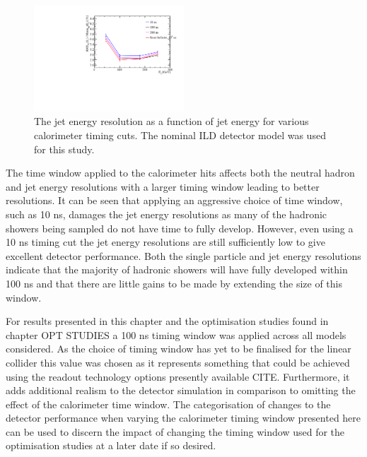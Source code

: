 \begin{figure}
\includegraphics[width=0.5\textwidth]{EnergyEstimators/Plots/TimingCuts/JER_vs_JetEnergy_TimingCutStudies.pdf}
\caption[The jet energy resolution as a function of jet energy for various calorimeter timing cuts.  The results shown use the nominal ILD detector model.]{The jet energy resolution as a function of jet energy for various calorimeter timing cuts.  The nominal ILD detector model was used for this study.}
\label{fig:jertimingcuts}
\end{figure}

The time window applied to the calorimeter hits affects both the neutral hadron and jet energy resolutions with a larger timing window leading to better resolutions.  It can be seen that applying an aggressive choice of time window, such as 10 ns, damages the jet energy resolutions as many of the hadronic showers being sampled do not have time to fully develop.  However, even using a 10 ns timing cut the jet energy resolutions are still sufficiently low to give excellent detector performance.  Both the single particle and jet energy resolutions indicate that the majority of hadronic showers will have fully developed within 100 ns and that there are little gains to be made by extending the size of this window.  

For results presented in this chapter and the optimisation studies found in chapter OPT STUDIES a 100 ns timing window was applied across all models considered.  As the choice of timing window has yet to be finalised for the linear collider this value was chosen as it represents something that could be achieved using the readout technology options presently available CITE.  Furthermore, it adds additional realism to the detector simulation in comparison to omitting the effect of the calorimeter time window.  The categorisation of changes to the detector performance when varying the calorimeter timing window presented here can be used to discern the impact of changing the timing window used for the optimisation studies at a later date if so desired.  

